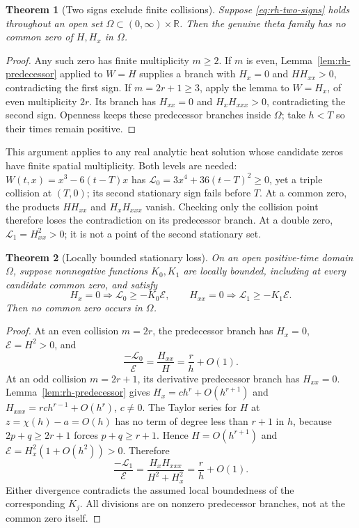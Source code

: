 \documentclass[11pt]{article}
\numberwithin{equation}{section}
\newtheorem{theorem}{Theorem}[section]
\theoremstyle{definition}
\theoremstyle{remark}
\begin{document}
\begin{theorem}[Two signs exclude finite collisions]
\label{thm:rh-stationary-local}
Suppose \eqref{eq:rh-two-signs} holds throughout an open set
$\Omega\subset(0,\infty)\times\mathbb R$.  Then the genuine theta
family has no common zero of $H,H_x$ in $\Omega$.
\end{theorem}
\begin{proof}
Any such zero has finite multiplicity $m\ge2$.  If $m$ is even,
Lemma~\ref{lem:rh-predecessor} applied to $W=H$ supplies a branch
with $H_x=0$ and $HH_{xx}>0$, contradicting the first sign.  If
$m=2r+1\ge3$, apply the lemma to $W=H_x$, of even multiplicity $2r$.
Its branch has $H_{xx}=0$ and $H_xH_{xxx}>0$, contradicting the
second sign.  Openness keeps these predecessor branches inside $\Omega$;
take $h<T$ so their times remain positive.
\end{proof}
This argument applies to any real analytic heat solution whose candidate
zeros have finite spatial multiplicity.  Both levels are needed:
$W(t,x)=x^3-6(t-T)x$ has $\mathscr L_0=3x^4+36(t-T)^2\ge0$, yet
a triple collision at $(T,0)$; its second stationary sign fails before
$T$.  At a common zero, the products $HH_{xx}$ and $H_xH_{xxx}$ vanish.
Checking only the collision point therefore loses the contradiction on
its predecessor branch.  At a double zero, $\mathscr L_1=H_{xx}^2>0$;
it is not a point of the second stationary set.

\begin{theorem}[Locally bounded stationary loss]
\label{thm:rh-bounded-loss}
On an open positive-time domain $\Omega$, suppose nonnegative functions
$K_0,K_1$ are locally bounded, including at every candidate common zero,
and satisfy
\begin{equation}
 H_x=0\Longrightarrow\mathscr L_0\ge-K_0\mathcal E,
 \qquad
 H_{xx}=0\Longrightarrow\mathscr L_1\ge-K_1\mathcal E.
 \label{eq:rh-bounded-loss}
\end{equation}
Then no common zero occurs in $\Omega$.
\end{theorem}
\begin{proof}
At an even collision $m=2r$, the predecessor branch has $H_x=0$,
$\mathcal E=H^2>0$, and
\[
 \frac{-\mathscr L_0}{\mathcal E}
 =\frac{H_{xx}}H=\frac r h+O(1).
\]
At an odd collision $m=2r+1$, its derivative predecessor branch has
$H_{xx}=0$.  Lemma~\ref{lem:rh-predecessor} gives
$H_x=c h^r+O(h^{r+1})$ and
$H_{xxx}=r c h^{r-1}+O(h^r)$, $c\ne0$.
The Taylor series for $H$ at $z=\chi(h)-a=O(h)$ has no term of
degree less than $r+1$ in $h$, because $2p+q\ge2r+1$ forces
$p+q\ge r+1$.  Hence $H=O(h^{r+1})$ and
$\mathcal E=H_x^2(1+O(h^2))>0$.  Therefore
\[
 \frac{-\mathscr L_1}{\mathcal E}
 =\frac{H_xH_{xxx}}{H^2+H_x^2}=\frac r h+O(1).
\]
Either divergence contradicts the assumed local boundedness of the
corresponding $K_j$.  All divisions are on nonzero predecessor branches,
not at the common zero itself.
\end{proof}
\end{document}
